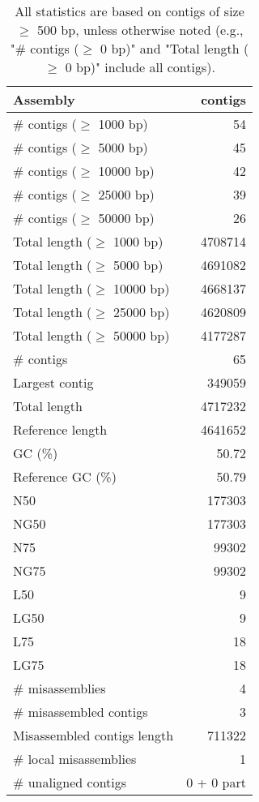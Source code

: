 \documentclass[12pt,a4paper]{article}
\begin{document}
\begin{table}[ht]
\begin{center}
\caption{All statistics are based on contigs of size $\geq$ 500 bp, unless otherwise noted (e.g., "\# contigs ($\geq$ 0 bp)" and "Total length ($\geq$ 0 bp)" include all contigs).}
\begin{tabular}{|l*{1}{|r}|}
\hline
Assembly & contigs \\ \hline
\# contigs ($\geq$ 1000 bp) & 54 \\ \hline
\# contigs ($\geq$ 5000 bp) & 45 \\ \hline
\# contigs ($\geq$ 10000 bp) & 42 \\ \hline
\# contigs ($\geq$ 25000 bp) & 39 \\ \hline
\# contigs ($\geq$ 50000 bp) & 26 \\ \hline
Total length ($\geq$ 1000 bp) & 4708714 \\ \hline
Total length ($\geq$ 5000 bp) & 4691082 \\ \hline
Total length ($\geq$ 10000 bp) & 4668137 \\ \hline
Total length ($\geq$ 25000 bp) & 4620809 \\ \hline
Total length ($\geq$ 50000 bp) & 4177287 \\ \hline
\# contigs & 65 \\ \hline
Largest contig & 349059 \\ \hline
Total length & 4717232 \\ \hline
Reference length & 4641652 \\ \hline
GC (\%) & 50.72 \\ \hline
Reference GC (\%) & 50.79 \\ \hline
N50 & 177303 \\ \hline
NG50 & 177303 \\ \hline
N75 & 99302 \\ \hline
NG75 & 99302 \\ \hline
L50 & 9 \\ \hline
LG50 & 9 \\ \hline
L75 & 18 \\ \hline
LG75 & 18 \\ \hline
\# misassemblies & 4 \\ \hline
\# misassembled contigs & 3 \\ \hline
Misassembled contigs length & 711322 \\ \hline
\# local misassemblies & 1 \\ \hline
\# unaligned contigs & 0 + 0 part \\ \hline

\end{tabular}
\end{center}
\end{table}
\end{document}
